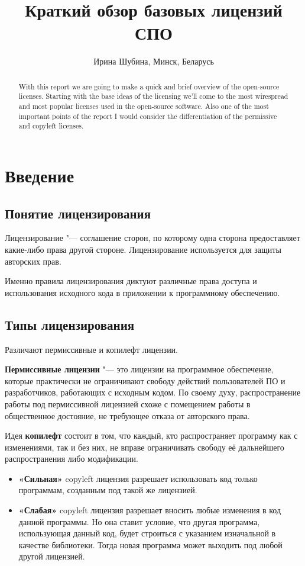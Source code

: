 \documentclass[10pt, a5paper]{article}
\begin{document}
\title{Краткий обзор базовых лицензий СПО}
\author{Ирина Шубина, Минск, Беларусь}
\maketitle
\begin{abstract}
With this report we are going to make a quick and brief overview of the open-source licenses. Starting with the base ideas of the licensing we'll come to the most wirespread and most popular licenses used in the open-source software. Also one of the most important points of the report I would consider the differentiation of the permissive and copyleft licenses.
\end{abstract}
\section*{Введение}

\subsection*{Понятие лицензирования}

Лицензирование "--- соглашение сторон, по которому одна сторона предоставляет какие-либо права другой стороне. Лицензирование используется для защиты авторских прав.

Именно правила лицензирования диктуют различные права доступа и использования исходного кода в приложении к программному обеспечению.

\subsection*{Типы лицензирования}

Различают пермиссивные и копилефт лицензии.

\textbf{Пермиссивные лицензии} "--- это лицензии на программное обеспечение, которые практически не ограничивают свободу действий пользователей ПО и разработчиков, работающих с исходным кодом. По своему духу, распространение работы под пермиссивной лицензией схоже с помещением работы в общественное достояние, не требующее отказа от авторского права.

Идея \textbf{копилефт} состоит в том, что каждый, кто распространяет программу как с изменениями, так и без них, не вправе ограничивать свободу её дальнейшего распространения либо модификации.

\begin{itemize}
  \item \textbf{«Сильная»} copyleft лицензия  разрешает использовать код только программам, созданным под такой же лицензией.
  \item \textbf{«Слабая»} copyleft лицензия разрешает вносить любые изменения в код данной программы. Но она ставит условие, что другая программа, использующая данный код, будет строиться с указанием изначальной в качестве библиотеки. Тогда новая программа может выходить под любой другой лицензией.
\end{itemize}
\end{document}
